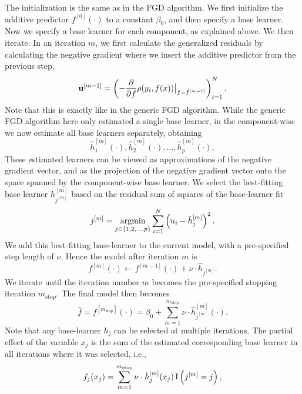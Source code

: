 The initialization is the same as in the FGD algorithm. We first initialize the additive predictor $f^{[0]}(\cdot)$ to a constant $\beta_0$, and then specify a base learner. Now we specify a base learner for each component, as explained above. We then iterate. In an iteration $m$, we first calculate the generalized residuals by calculating the negative gradient where we insert the additive predictor from the previous step,
\begin{equation}
    \mathbf{u}^{[m-1]}=\left(-\frac{\partial}{\partial f}\rho(y_i, f(x))\big\rvert_{f=\hat{f}^{[m-1]}}\right)_{i=1}^N.
\end{equation}
Note that this is exactly like in the generic FGD algorithm. While the generic FGD algorithm here only estimated a single base learner, in the component-wise we now estimate all base learners separately, obtaining
\begin{equation}
    \hat{h}_1^{[m]}(\cdot),\hat{h}_2^{[m]}(\cdot),\ldots,\hat{h}_p^{[m]}(\cdot),
\end{equation}
These estimated learners can be viewed as approximations of the negative gradient vector, and as the projection of the negative gradient vector onto the space spanned by the component-wise base learner. We select the best-fitting base-learner $h_{j^{[m]}}^{[m]}$ based on the residual sum of squares of the base-learner fit
\begin{equation}
    j^{[m]}=\operatorname*{argmin}_{j\in\{1,2,\ldots,p\}}\sum_{i=1}^N \left(u_i-\hat{h}_j^{[m]}\right)^2.
\end{equation}
We add this best-fitting base-learner to the current model, with a pre-specified step length of $\nu$. Hence the model after iteration $m$ is
\begin{equation}
    f^{[m]}(\cdot)\gets f^{[m-1]}(\cdot)+\nu\cdot\hat{h}_{j^{[m]}}.
\end{equation}
We iterate until the iteration number $m$ becomes the pre-specified stopping iteration $m_{\text{stop}}$. The final model then becomes
\begin{equation}
    \hat{f}=f^{[m_{\text{stop}}]}(\cdot)=\beta_0 + \sum_{m=1}^{m_{\text{stop}}}\nu\cdot\hat{h}_{j^{[m]}}^{[m]}(\cdot).
\end{equation}
Note that any base-learner $h_j$ can be selected at multiple iterations. The partial effect of the variable $x_j$ is the sum of the estimated corresponding base learner in all iterations where it was selected, i.e.,
\begin{equation*}
    f_j(x_j)=\sum_{m=1}^{m_{\text{stop}}}\nu\cdot\hat{h}_j^{[m]}(x_j)\operatorname{I}\left(j^{[m]}=j\right),
\end{equation*}
